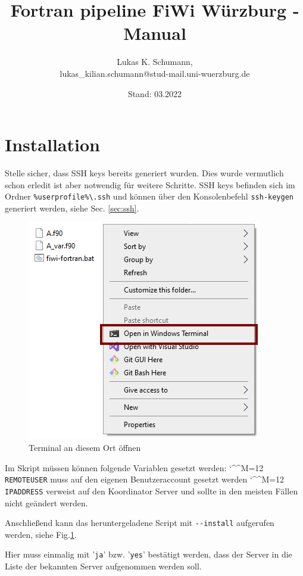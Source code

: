 \documentclass[11pt, a4paper]{article}
\title{\vspace{-3cm}Fortran pipeline FiWi Würzburg - Manual}
\author{Lukas K. Schumann, \\\small{lukas\_kilian.schumann@stud-mail.uni-wuerzburg.de}}
\date{Stand: 03.2022}
\newcommand{\bs}{\textbackslash}
\def\e{\begingroup\catcode`\^^M=12 \xmymacro}
{\catcode`\^^M=12 %
 \gdef\xmymacro#1^^M{\begin{itemize}\item #1\end{itemize}\endgroup}%
}
\begin{document}
\maketitle

\bigskip\noindent


\vspace{-1cm}
\section{Installation}


Stelle sicher, dass SSH keys bereits generiert wurden. Dies wurde vermutlich schon erledit ist aber notwendig für weitere Schritte.
SSH keys befinden sich im Ordner \texttt{\%userprofile\%\bs.ssh} und können über den Konsolenbefehl \texttt{ssh-keygen} generiert werden, siehe Sec. \ref{sec:ssh}.

\begin{figure}
    \centering
    \includegraphics[width=0.65\linewidth]{./pics/2022-03-08_23-52.png}
    \caption{Terminal an diesem Ort öffnen}
    \vspace{-5em}
    \label{fig:install-1}
\end{figure}

Im Skript müssen können folgende Variablen gesetzt werden:
\e \texttt{REMOTEUSER} muss auf den eigenen Benutzeraccount gesetzt werden
\e \texttt{IPADDRESS} verweist auf den Koordinator Server und sollte in den meisten Fällen nicht geändert werden.

Anschließend kann das heruntergeladene Script mit \texttt{-{}-install} aufgerufen werden, siehe Fig.\ref{fig:install-1}.

Hier muss einmalig mit '\texttt{ja}' bzw. '\texttt{yes}' bestätigt werden, dass der Server in die Liste der bekannten Server aufgenommen werden soll.
\end{document}
